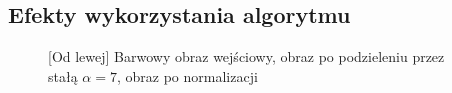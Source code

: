 \documentclass[a4paper,12pt, titlepage]{report}
\begin{document}
\subsection*{Efekty wykorzystania algorytmu}
\begin{figure}[h]
    \centering
    \caption{[Od lewej] Barwowy obraz wejściowy, obraz po podzieleniu przez stałą \(\alpha=7\), obraz po normalizacji}%
    \label{fig:rysunek}%
\end{figure}
\FloatBarrier
\end{document}

